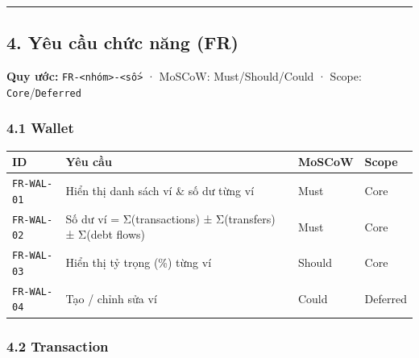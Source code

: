 \documentclass[11pt,a4paper]{article}
\newcounter{none}
\newcommand{\faintline}{\noalign{\global\arrayrulecolor{faintgray}}\hline\noalign{\global\arrayrulecolor{black}}} %
\begin{document}
\begin{center}\rule{1.0\linewidth}{0.5pt}\end{center}

\subsection{4. Yêu cầu chức năng (FR)}\label{yuxeau-cux1ea7u-chux1ee9c-nux103ng-fr}

\textbf{Quy ước:}
\texttt{FR-\textless{}nhóm\textgreater{}-\textless{}số\textgreater{}} ·
MoSCoW: Must/Should/Could · Scope: \texttt{Core}/\texttt{Deferred}

\subsubsection{4.1 Wallet}\label{wallet}

{\def\LTcaptype{none}
\begin{longtable}[]{@{}
  >{\raggedright\arraybackslash}p{}
  >{\raggedright\arraybackslash}p{}
  >{\centering\arraybackslash}p{}
  >{\centering\arraybackslash}p{}@{}}
\toprule\noalign{}
\begin{minipage}[b]{\linewidth}\raggedright
ID
\end{minipage} & \begin{minipage}[b]{\linewidth}\raggedright
Yêu cầu
\end{minipage} & \begin{minipage}[b]{\linewidth}\raggedright
MoSCoW
\end{minipage} & \begin{minipage}[b]{\linewidth}\raggedright
Scope
\end{minipage} \\
\midrule\noalign{}
\endhead
\bottomrule\noalign{}
\endlastfoot
\texttt{FR-WAL-01} & Hiển thị danh sách ví \& số dư từng ví & Must & Core \\ \faintline
\texttt{FR-WAL-02} & Số dư ví = Σ(transactions) ± Σ(transfers) ± Σ(debt flows) & Must & Core \\ \faintline
\texttt{FR-WAL-03} & Hiển thị tỷ trọng (\%) từng ví & Should & Core \\ \faintline
\texttt{FR-WAL-04} & Tạo / chỉnh sửa ví & Could & Deferred \\
\end{longtable}
}

\subsubsection{4.2 Transaction}\label{transaction}
\end{document}
